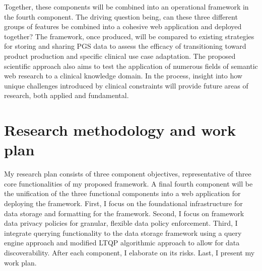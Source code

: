 \documentclass[a4paper,11pt]{article}
\begin{document}
\begin{refsection}
Together, these components will be combined into an operational framework in the fourth component. 
The driving question being, can these three different groups of features be combined into a cohesive web application and deployed together?
The framework, once produced, will be compared to existing strategies for storing and sharing PGS data to assess the efficacy of transitioning toward product production and specific clinical use case adaptation.
The proposed scientific approach also aims to test the application of numerous fields of semantic web research to a clinical knowledge domain. 
In the process, insight into how unique challenges introduced by clinical constraints will provide future areas of research, both applied and fundamental.

\newpage

\section{Research methodology and work plan}

\begin{comment}
Elaborate the different envisaged steps (experiments/activities) in your research, and motivate strategic choices in view of reaching the objectives. 
Describe the set-up and cohesion of the work packages including intermediate goals (milestones).
Show where the proposed methodology (research approach) is according to the state of the art and where it is novel. 

Discuss risks that might endanger reaching project objectives and the contingency plans to be put in place should this risk occur.
Use a table or graphic representation of the planned course of activities (timing work packages, milestones, critical path) over the 4-years grant period.
\end{comment}

\medskip

\noindent
My research plan consists of three component objectives, representative of three core functionalities of my proposed framework.
A final fourth component will be the unification of the three functional components into a web application for deploying the framework.
%
First, I focus on the foundational infrastructure for data storage and formatting for the framework.
%
Second, I focus on framework data privacy policies for granular, flexible data policy enforcement.
%
Third, I integrate querying functionality to the data storage framework using a query engine approach and modified LTQP algorithmic approach to allow for data discoverability.
%
After each component, I elaborate on its risks.
Last, I present my work plan.


\end{refsection}
\end{document}
